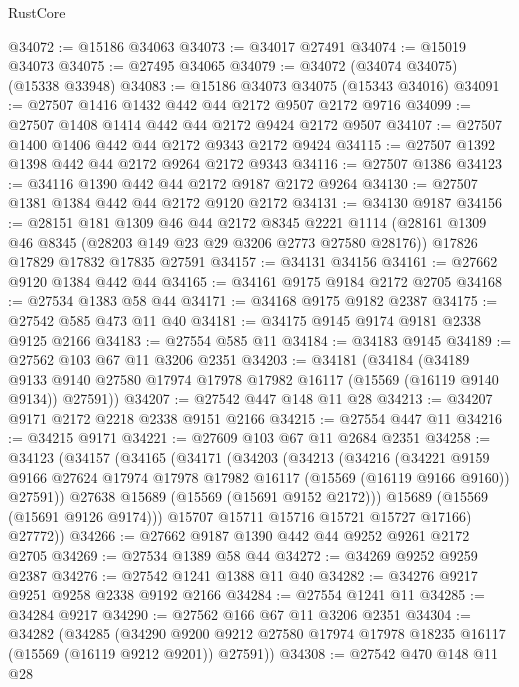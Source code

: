 \begin{lexlean}{RustCore}
\begin{coremodule}
@34072 := @15186 @34063
@34073 := @34017 @27491
@34074 := @15019 @34073
@34075 := @27495 @34065
@34079 := @34072 (@34074 @34075) (@15338 @33948)
@34083 := @15186 @34073 @34075 (@15343 @34016)
@34091 := @27507 @1416 @1432 @442 @44 @2172 @9507 @2172 @9716
@34099 := @27507 @1408 @1414 @442 @44 @2172 @9424 @2172 @9507
@34107 := @27507 @1400 @1406 @442 @44 @2172 @9343 @2172 @9424
@34115 := @27507 @1392 @1398 @442 @44 @2172 @9264 @2172 @9343
@34116 := @27507 @1386
@34123 := @34116 @1390 @442 @44 @2172 @9187 @2172 @9264
@34130 := @27507 @1381 @1384 @442 @44 @2172 @9120 @2172
@34131 := @34130 @9187
@34156 := @28151
    @181
    @1309
    @46
    @44
    @2172
    @8345
    @2221
    @1114
    (@28161 @1309 @46 @8345 (@28203 @149 @23 @29 @3206 @2773 @27580 @28176))
    @17826
    @17829
    @17832
    @17835
    @27591
@34157 := @34131 @34156
@34161 := @27662 @9120 @1384 @442 @44
@34165 := @34161 @9175 @9184 @2172 @2705
@34168 := @27534 @1383 @58 @44
@34171 := @34168 @9175 @9182 @2387
@34175 := @27542 @585 @473 @11 @40
@34181 := @34175 @9145 @9174 @9181 @2338 @9125 @2166
@34183 := @27554 @585 @11
@34184 := @34183 @9145
@34189 := @27562 @103 @67 @11 @3206 @2351
@34203 := @34181
    (@34184
      (@34189 @9133 @9140 @27580 @17974 @17978 @17982 @16117 (@15569 (@16119 @9140 @9134)) @27591))
@34207 := @27542 @447 @148 @11 @28
@34213 := @34207 @9171 @2172 @2218 @2338 @9151 @2166
@34215 := @27554 @447 @11
@34216 := @34215 @9171
@34221 := @27609 @103 @67 @11 @2684 @2351
@34258 := @34123
    (@34157
      (@34165
        (@34171
          (@34203
            (@34213
              (@34216
                (@34221
                  @9159
                  @9166
                  @27624
                  @17974
                  @17978
                  @17982
                  @16117
                  (@15569 (@16119 @9166 @9160))
                  @27591))
              @27638
              @15689
              (@15569 (@15691 @9152 @2172)))
            @15689
            (@15569 (@15691 @9126 @9174)))
          @15707
          @15711
          @15716
          @15721
          @15727
          @17166)
        @27772))
@34266 := @27662 @9187 @1390 @442 @44 @9252 @9261 @2172 @2705
@34269 := @27534 @1389 @58 @44
@34272 := @34269 @9252 @9259 @2387
@34276 := @27542 @1241 @1388 @11 @40
@34282 := @34276 @9217 @9251 @9258 @2338 @9192 @2166
@34284 := @27554 @1241 @11
@34285 := @34284 @9217
@34290 := @27562 @166 @67 @11 @3206 @2351
@34304 := @34282
    (@34285
      (@34290 @9200 @9212 @27580 @17974 @17978 @18235 @16117 (@15569 (@16119 @9212 @9201)) @27591))
@34308 := @27542 @470 @148 @11 @28

\end{coremodule}
\end{lexlean}
